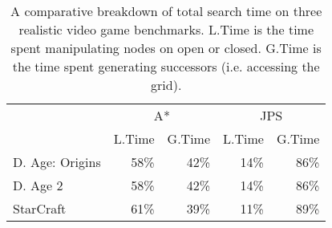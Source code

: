 {\setlength{\tabcolsep}{0.5em}
\begin{table}[b!]
\vspace{-1em}
\small
\centering
\begin{tabular}{l|rr|rr}
  \hline
& \multicolumn{2}{c|}{A{*}} & \multicolumn{2}{c}{JPS} \\
& L.Time & G.Time & L.Time &  G.Time \\ \hline
D. Age: Origins & 58\% & 42\% & 14\% & 86\% \\ 
D. Age 2 & 58\% & 42\% & 14\% & 86\% \\ 
StarCraft & 61\% & 39\% & 11\% & 89\% \\ 
   \hline
\end{tabular}
\caption{\small A comparative breakdown of total search time on three realistic
video game benchmarks.
L.Time is the time spent manipulating nodes on open or closed.
G.Time is the time spent generating successors (i.e. accessing the grid).}
\label{table::bottleneck}
\end{table}
}
